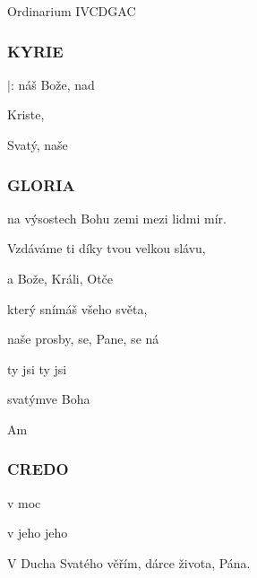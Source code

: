 \setcounter{page}{111}
\begin{song}{Ordinarium IV}{CDGAC}{}

\subsubsection*{KYRIE}
\begin{SBChorus*}
$|$: náš Bože,   nad 

 Kriste,   

 Svatý,  naše   
\end{SBChorus*}
\subsubsection*{GLORIA}
\begin{SBChorus*}

 na výsostech Bohu  zemi mezi lidmi mír.

Vzdáváme ti díky  tvou velkou slávu,

 a Bože,  Králi,  Otče  

 který snímáš  všeho světa,

 naše prosby,  se, Pane,  se  ná 

 ty jsi   ty jsi 

   svatýmve  Boha 

Am  
\end{SBChorus*}


\subsubsection*{CREDO}
\begin{SBVerse}
 v    moc

 v jeho    jeho 
\end{SBVerse}
\begin{SBChorus}
      
\end{SBChorus}
\begin{SBVerse}
V Ducha Svatého věřím, dárce života, Pána.


\end{SBVerse}
\end{song}
